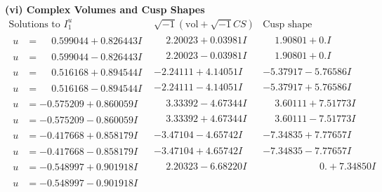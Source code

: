 \documentclass[1p]{elsarticle_modified}
\theoremstyle{definition}
\newcommand{\I}{\sqrt{-1}}
\begin{document}
\newpage\flushleft \textbf{(vi) Complex Volumes and Cusp Shapes}
$$\begin{array}{c|c|c}  
\text{Solutions to }I^u_{1}& \I (\text{vol} + \sqrt{-1}CS) & \text{Cusp shape}\\
 \hline 
\begin{aligned}
u &= \phantom{-}0.599044 + 0.826443 I\end{aligned}
 & \phantom{-}2.20023 + 0.03981 I & \phantom{-}1.90801 + 0. I\phantom{ +0.000000I} \\ \hline\begin{aligned}
u &= \phantom{-}0.599044 - 0.826443 I\end{aligned}
 & \phantom{-}2.20023 - 0.03981 I & \phantom{-}1.90801 + 0. I\phantom{ +0.000000I} \\ \hline\begin{aligned}
u &= \phantom{-}0.516168 + 0.894544 I\end{aligned}
 & -2.24111 + 4.14051 I & -5.37917 - 5.76586 I \\ \hline\begin{aligned}
u &= \phantom{-}0.516168 - 0.894544 I\end{aligned}
 & -2.24111 - 4.14051 I & -5.37917 + 5.76586 I \\ \hline\begin{aligned}
u &= -0.575209 + 0.860059 I\end{aligned}
 & \phantom{-}3.33392 - 4.67344 I & \phantom{-}3.60111 + 7.51773 I \\ \hline\begin{aligned}
u &= -0.575209 - 0.860059 I\end{aligned}
 & \phantom{-}3.33392 + 4.67344 I & \phantom{-}3.60111 - 7.51773 I \\ \hline\begin{aligned}
u &= -0.417668 + 0.858179 I\end{aligned}
 & -3.47104 - 4.65742 I & -7.34835 + 7.77657 I \\ \hline\begin{aligned}
u &= -0.417668 - 0.858179 I\end{aligned}
 & -3.47104 + 4.65742 I & -7.34835 - 7.77657 I \\ \hline\begin{aligned}
u &= -0.548997 + 0.901918 I\end{aligned}
 & \phantom{-}2.20323 - 6.68220 I & \phantom{-0.000000 -}0. + 7.34850 I \\ \hline\begin{aligned}
u &= -0.548997 - 0.901918 I\end{aligned}

\end{array}$$
\end{document}
